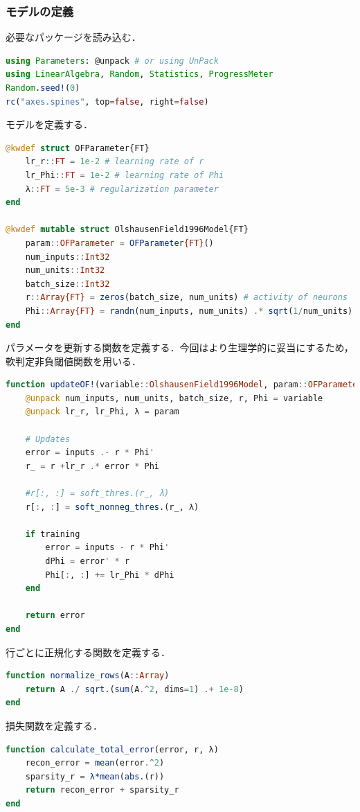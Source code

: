 \subsubsection{モデルの定義}
必要なパッケージを読み込む．
\begin{lstlisting}[language=julia]
using Parameters: @unpack # or using UnPack
using LinearAlgebra, Random, Statistics, ProgressMeter
Random.seed!(0)
rc("axes.spines", top=false, right=false)
\end{lstlisting}
モデルを定義する．
\begin{lstlisting}[language=julia]
@kwdef struct OFParameter{FT}
    lr_r::FT = 1e-2 # learning rate of r
    lr_Phi::FT = 1e-2 # learning rate of Phi
    λ::FT = 5e-3 # regularization parameter
end

@kwdef mutable struct OlshausenField1996Model{FT}
    param::OFParameter = OFParameter{FT}()
    num_inputs::Int32
    num_units::Int32
    batch_size::Int32
    r::Array{FT} = zeros(batch_size, num_units) # activity of neurons
    Phi::Array{FT} = randn(num_inputs, num_units) .* sqrt(1/num_units)
end
\end{lstlisting}
パラメータを更新する関数を定義する．今回はより生理学的に妥当にするため，軟判定非負閾値関数を用いる．
\begin{lstlisting}[language=julia]
function updateOF!(variable::OlshausenField1996Model, param::OFParameter, inputs::Array, training::Bool)
    @unpack num_inputs, num_units, batch_size, r, Phi = variable
    @unpack lr_r, lr_Phi, λ = param

    # Updates                
    error = inputs .- r * Phi'
    r_ = r +lr_r .* error * Phi

    #r[:, :] = soft_thres.(r_, λ)
    r[:, :] = soft_nonneg_thres.(r_, λ)

    if training 
        error = inputs - r * Phi'
        dPhi = error' * r
        Phi[:, :] += lr_Phi * dPhi
    end
    
    return error
end
\end{lstlisting}
行ごとに正規化する関数を定義する．
\begin{lstlisting}[language=julia]
function normalize_rows(A::Array)
    return A ./ sqrt.(sum(A.^2, dims=1) .+ 1e-8)
end
\end{lstlisting}
損失関数を定義する．
\begin{lstlisting}[language=julia]
function calculate_total_error(error, r, λ)
    recon_error = mean(error.^2)
    sparsity_r = λ*mean(abs.(r)) 
    return recon_error + sparsity_r
end
\end{lstlisting}
